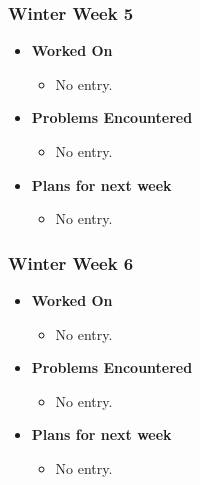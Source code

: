\documentclass[compsoc,draftclsnofoot,onecolumn,10pt]{IEEEtran}
\begin{document}
\subsubsection{Winter Week 5}
\begin{itemize}
    \item {\textbf{Worked On}}
    \begin{itemize}
      \item No entry.
    \end{itemize}

    \item {\textbf{Problems Encountered}}
    \begin{itemize}
      \item No entry.
    \end{itemize}

    \item{\textbf{Plans for next week}}
    \begin{itemize}
      \item No entry.
    \end{itemize}

\end{itemize}

\subsubsection{Winter Week 6}
\begin{itemize}
    \item {\textbf{Worked On}}
    \begin{itemize}
      \item No entry.
    \end{itemize}

    \item {\textbf{Problems Encountered}}
    \begin{itemize}
      \item No entry.
    \end{itemize}

    \item{\textbf{Plans for next week}}
    \begin{itemize}
      \item No entry.
    \end{itemize}

\end{itemize}
\end{document}
